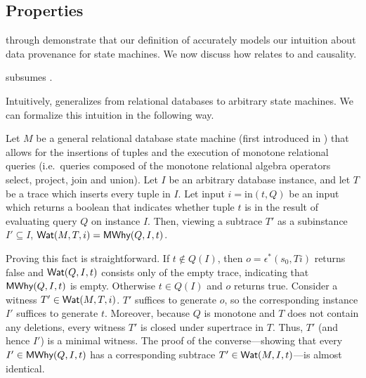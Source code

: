 \subsection{\WatProvenance{} Properties}
 through  demonstrate
that our definition of \watprovenance{} accurately models our intuition about
data provenance for state machines. We now discuss how \watprovenance{} relates
to \whyprovenance{} and causality.

%

\begin{claim}
  \Watprovenance{} subsumes \whyprovenance{}.
\end{claim}

\newcommand{\Min}{\text{in}}
Intuitively, \watprovenance{} generalizes \whyprovenance{} from relational
databases to arbitrary state machines. We can formalize this intuition in the
following way.

Let $M$ be a general relational database state machine (first introduced in
) that allows for the insertions of tuples and
the execution of monotone relational queries (i.e.\ queries composed of the
monotone relational algebra operators select, project, join and union). Let
$I$ be an arbitrary database instance, and let $T$ be a trace which inserts
every tuple in $I$. Let input $i = \Min(t, Q)$ be an input which returns a
boolean that indicates whether tuple $t$ is in the result of evaluating query
$Q$ on instance $I$. Then, viewing a subtrace $T'$ as a subinstance $I'
\subseteq I$, $\textsf{Wat}(M, T, i) = \textsf{MWhy}(Q, I, t)$.

Proving this fact is straightforward.
%
If $t \notin Q(I)$, then $o = \epsilon^*(s_0, Ti)$ returns false and $\textsf{Wat}(Q,
I, t)$ consists only of the empty trace, indicating that $\textsf{MWhy}(Q, I, t)$ is
empty.
%
Otherwise $t \in Q(I)$ and $o$ returns true. Consider a witness $T' \in \textsf{Wat}(M,
T, i)$. $T'$ suffices to generate $o$, so the corresponding instance $I'$
suffices to generate $t$. Moreover, because $Q$ is monotone and $T$ does not
contain any deletions, every witness $T'$ is closed under supertrace in $T$.
Thus, $T'$ (and hence $I'$) is a minimal witness. The proof of the
converse---showing that every $I' \in \textsf{MWhy}(Q, I, t)$ has a corresponding
subtrace $T' \in \textsf{Wat}(M, I, t)$---is almost identical.

